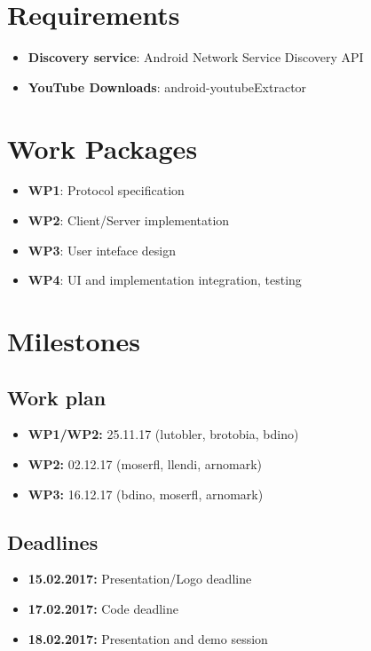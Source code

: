 \documentclass{report}
\begin{document}
\section{Requirements}
\begin{itemize}
    \item {\bf Discovery service}: Android Network Service Discovery API \cite{nsd}
    \item {\bf YouTube Downloads}: android-youtubeExtractor \cite{youtubeExtractor}
\end{itemize}

\section{Work Packages}
\begin{itemize}
    \item {\bf WP1}: Protocol specification
    \item {\bf WP2}: Client/Server implementation
    \item {\bf WP3}: User inteface design
    \item {\bf WP4}: UI and implementation integration, testing
\end{itemize}

\section{Milestones}
\subsection*{Work plan}
\begin{itemize}
    \item {\bf WP1/WP2:} 25.11.17 (lutobler, brotobia, bdino)
    \item {\bf WP2:} 02.12.17 (moserfl, llendi, arnomark)
    \item {\bf WP3:} 16.12.17 (bdino, moserfl, arnomark)
\end{itemize}

\subsection*{Deadlines}
\begin{itemize}
    \item {\bf 15.02.2017:} Presentation/Logo deadline
    \item {\bf 17.02.2017:} Code deadline
    \item {\bf 18.02.2017:} Presentation and demo session
\end{itemize}
\end{document}
